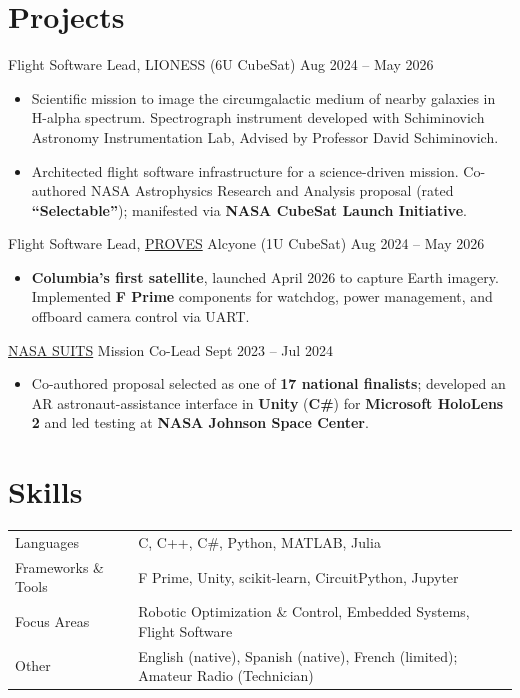 \documentclass[a4paper,12pt]{article}
\newenvironment{joblongsameorg}[2]
    {
    \noindent #1 \dotfill #2 \\[3.75pt]
    \begin{minipage}[t]{\linewidth}
    \begin{itemize}[nosep,after=\strut, leftmargin=1em, itemsep=3pt,label=--]
    }
    {
    \end{itemize}
    \end{minipage}    
    }
\begin{document}
\section{Projects}

\begin{joblongsameorg}{Flight Software Lead, LIONESS (6U CubeSat)}{Aug 2024 -- May 2026}
\item Scientific mission to image the circumgalactic medium of nearby galaxies in H-alpha spectrum. Spectrograph instrument developed with Schiminovich Astronomy Instrumentation Lab, Advised by Professor David Schiminovich.
\item Architected flight software infrastructure for a science-driven mission. Co-authored NASA Astrophysics Research and Analysis proposal (rated \textbf{``Selectable''}); manifested via \textbf{NASA CubeSat Launch Initiative}.
\end{joblongsameorg}

\begin{joblongsameorg}{Flight Software Lead, \href{https://github.com/Open-Source-Space-Foundation/proves-core-reference}{PROVES} Alcyone (1U CubeSat)}{Aug 2024 -- May 2026}
\item \textbf{Columbia's first satellite}, launched April 2026 to capture Earth imagery. Implemented \textbf{F Prime} components for watchdog, power management, and offboard camera control via UART.
\end{joblongsameorg}

\begin{joblongsameorg}{\href{https://www.nasa.gov/learning-resources/spacesuit-user-interface-technologies-for-students/}{NASA SUITS} Mission Co-Lead}{Sept 2023 -- Jul 2024}
\item Co-authored proposal selected as one of \textbf{17 national finalists}; developed an AR astronaut-assistance interface in \textbf{Unity} (\textbf{C\#}) for \textbf{Microsoft HoloLens 2} and led testing at \textbf{NASA Johnson Space Center}.
\end{joblongsameorg}

\section{Skills}
\begin{tabularx}{\linewidth}{@{}l X@{}}
Languages & \normalsize{C, C++, C\#, Python, MATLAB, Julia}\\
Frameworks \& Tools & \normalsize{F Prime, Unity, scikit-learn, CircuitPython, Jupyter}\\
Focus Areas & \normalsize{ Robotic Optimization \& Control, Embedded Systems, Flight Software}\\
Other & \normalsize{English (native), Spanish (native), French (limited); Amateur Radio (Technician)}\\
\end{tabularx}

\vfill
{}
\end{document}
